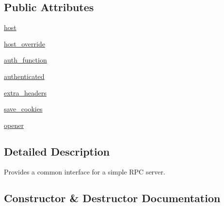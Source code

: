 \subsection*{Public Attributes}
\begin{DoxyCompactItemize}
\item 
\hyperlink{classupload_1_1AbstractRpcServer_ab7188d827e2faddcf970f524f5856192}{host}
\item 
\hyperlink{classupload_1_1AbstractRpcServer_a783a4a7e4ffb776a57a3f267300a213b}{host\+\_\+override}
\item 
\hyperlink{classupload_1_1AbstractRpcServer_aee0090a3bcf07b913a7dd596a5dabb8f}{auth\+\_\+function}
\item 
\hyperlink{classupload_1_1AbstractRpcServer_a692955750c802e461c6336d3000cd365}{authenticated}
\item 
\hyperlink{classupload_1_1AbstractRpcServer_adbbf0109afc13d58d7815fa143cb779f}{extra\+\_\+headers}
\item 
\hyperlink{classupload_1_1AbstractRpcServer_affe342205c4647d41b127f5a5634858b}{save\+\_\+cookies}
\item 
\hyperlink{classupload_1_1AbstractRpcServer_aa931446476e0e86f3ade7fef0a0aea5a}{opener}
\end{DoxyCompactItemize}


\subsection{Detailed Description}
\begin{DoxyVerb}Provides a common interface for a simple RPC server.\end{DoxyVerb}
 

\subsection{Constructor \& Destructor Documentation}
